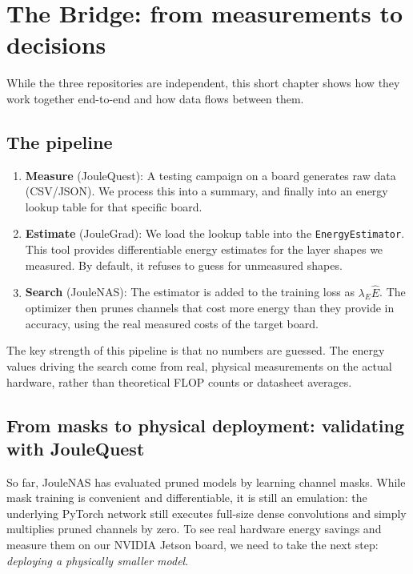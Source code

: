 \chapter{The Bridge: from measurements to decisions}
\label{chap:bridge}

While the three repositories are independent, this short chapter shows how they work together end-to-end and how data flows between them.

\section{The pipeline}

\begin{enumerate}
    \item \textbf{Measure} (JouleQuest): A testing campaign on a board generates raw data (CSV/JSON). We process this into a summary, and finally into an energy lookup table for that specific board.
    \item \textbf{Estimate} (JouleGrad): We load the lookup table into the \texttt{EnergyEstimator}. This tool provides differentiable energy estimates for the layer shapes we measured. By default, it refuses to guess for unmeasured shapes.
    \item \textbf{Search} (JouleNAS): The estimator is added to the training loss as $\lambda_E \widehat{E}$. The optimizer then prunes channels that cost more energy than they provide in accuracy, using the real measured costs of the target board.
\end{enumerate}

The key strength of this pipeline is that no numbers are guessed. The energy values driving the search come from real, physical measurements on the actual hardware, rather than theoretical FLOP counts or datasheet averages.

\section{From masks to physical deployment: validating with JouleQuest}
\label{sec:joulenas_to_joulequest}

So far, JouleNAS has evaluated pruned models by learning channel masks. While mask training is convenient and differentiable, it is still an emulation: the underlying PyTorch network still executes full-size dense convolutions and simply multiplies pruned channels by zero. To see real hardware energy savings and measure them on our NVIDIA Jetson board, we need to take the next step: \emph{deploying a physically smaller model}.

